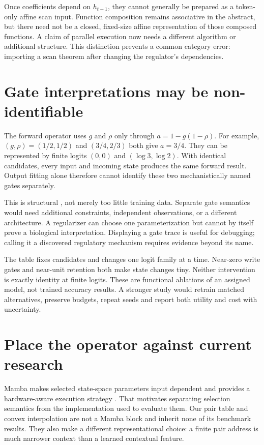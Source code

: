 Once coefficients depend on $h_{t-1}$, they cannot generally be prepared as a
token-only affine scan input. Function composition remains associative in the
abstract, but there need not be a closed, fixed-size affine representation of
those composed functions. A claim of parallel execution now needs a different
algorithm or additional structure. This distinction prevents a common category
error: importing a scan theorem after changing the regulator's dependencies.

\section{Gate interpretations may be non-identifiable}
The forward operator uses $g$ and $\rho$ only through $a=1-g(1-\rho)$.
For example, $(g,\rho)=(1/2,1/2)$ and $(3/4,2/3)$ both give $a=3/4$.
They can be represented by finite logits $(0,0)$ and $(\log3,\log2)$.
With identical candidates, every input and incoming state produces the same
forward result. Output fitting alone therefore cannot identify these two
mechanistically named gates separately.

This is structural , not merely too little training
data. Separate gate semantics would need additional constraints, independent
observations, or a different architecture. A regularizer can choose one
parameterization but cannot by itself prove a biological interpretation.
Displaying a gate trace is useful for debugging; calling it a discovered
regulatory mechanism requires evidence beyond its name.

\begin{center}\end{center}
The table fixes candidates and changes one logit family at a time. Near-zero
write gates and near-unit retention both make state changes tiny. Neither
intervention is exactly identity at finite logits. These are functional
ablations of an assigned model, not trained accuracy results. A stronger study
would retrain matched alternatives, preserve budgets, repeat seeds and report
both utility and cost with uncertainty.

\section{Place the operator against current research}
Mamba makes selected state-space parameters input dependent and provides a
hardware-aware execution strategy \cite{mamba}. That motivates separating
selection semantics from the implementation used to evaluate them. Our pair
table and convex interpolation are not a Mamba block and inherit none of its
benchmark results. They also make a different representational choice: a
finite pair address is much narrower context than a learned contextual feature.

